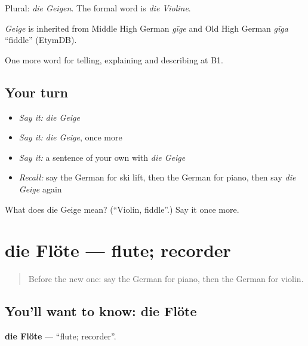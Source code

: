 Plural: \emph{die Geigen}. The formal word is \emph{die Violine}.

\begin{cousinweb}
\emph{Geige} is inherited from Middle High German \emph{gīge} and Old High German \emph{gīga} \textquotedblleft{}fiddle\textquotedblright{} (EtymDB).
\end{cousinweb}

\begin{grammarlens}[title={What you've built}]
One more word for telling, explaining and describing at B1.
\end{grammarlens}

\subsection*{Your turn}
\begin{itemize}
\raggedright
  \item \emph{Say it:} \emph{die Geige}
  \item \emph{Say it:} \emph{die Geige}, once more
  \item \emph{Say it:} a sentence of your own with \emph{die Geige}
  \item \emph{Recall:} say the German for ski lift, then the German for piano, then say \emph{die Geige} again
\end{itemize}

\begin{tcolorbox}[breakable,colback=teal!4,colframe=teal!35!black,title={Before you move on}]
What does die Geige mean? (\textquotedblleft{}Violin, fiddle\textquotedblright{}.) Say it once more.
\end{tcolorbox}
\section[die Flöte]{die Flöte — flute; recorder}

\label{lesson:GE-C513-floete}



\begin{quote}
Before the new one: say the German for piano, then the German for violin.
\end{quote}

\subsection*{You'll want to know: die Flöte}
\textbf{die Flöte} — \textquotedblleft{}flute; recorder\textquotedblright{}.


